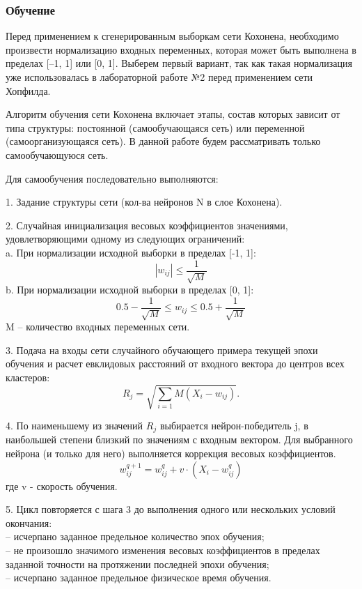 \documentclass[12pt,a4paper]{article}
\begin{document}
\subsubsection*{Обучение}
Перед применением к сгенерированным выборкам сети Кохонена, необходимо произвести нормализацию входных переменных, которая может быть выполнена в пределах [–1, 1] или [0, 1]. Выберем первый вариант, так как такая нормализация уже использовалась в лабораторной работе №2 перед применением сети Хопфилда. 

Алгоритм обучения сети Кохонена включает этапы, состав которых зависит от типа структуры: постоянной (самообучающаяся сеть) или переменной (самоорганизующаяся сеть). В данной работе будем рассматривать только самообучающуюся сеть. 


Для самообучения последовательно выполняются:

1.	Задание структуры сети (кол-ва нейронов N в слое Кохонена). 

2.	Случайная инициализация весовых коэффициентов значениями, удовлетворяющими одному из следующих ограничений:\\
a.	При нормализации исходной выборки в пределах [-1, 1]:
$$|w_{ij}| \leq \frac{1}{\sqrt{M}}$$
b.	При нормализации исходной выборки в пределах [0, 1]:
$$0.5 - \frac{1}{\sqrt{M}} \leq w_{ij} \leq 0.5 + \frac{1}{\sqrt{M}}$$
M – количество входных переменных сети.

3.	Подача на входы сети случайного обучающего примера текущей эпохи обучения и расчет евклидовых расстояний от входного вектора до центров всех кластеров:
$$R_j = \sqrt{\sum\limits_{i=1}{M} \left( X_i - w_{ij} \right)}.$$

4.	По наименьшему из значений $R_j$ выбирается нейрон-победитель j, в наибольшей степени близкий по значениям с входным вектором. Для выбранного нейрона (и только для него) выполняется коррекция весовых коэффициентов.
$$w_{ij}^{q+1} = w_{ij}^{q} + v\cdot \left( X_i - w_{ij}^{q} \right) $$
где v - скорость обучения.

5.	Цикл повторяется с шага 3 до выполнения одного или нескольких условий окончания:
\\
– исчерпано заданное предельное количество эпох обучения;\\
– не произошло значимого изменения весовых коэффициентов в пределах заданной точности на протяжении последней эпохи обучения;\\
– исчерпано заданное предельное физическое время обучения.\\
\end{document}
